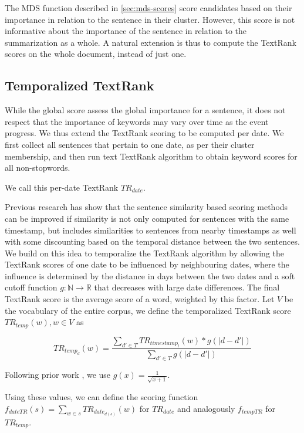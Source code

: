 \documentclass[a4paper,BCOR=10mm]{report}
\begin{document}
The MDS function described in \ref{sec:mds-scores} score candidates based on their importance in relation to the sentence in their cluster. However, this score is not informative about the importance of the sentence in relation to the summarization as a whole.
A natural extension is thus to compute the TextRank scores on the whole document, instead of just one.

\subsection{Temporalized TextRank}

While the global score assess the global importance for a sentence, it does not respect that the importance of keywords may vary over time as the event progress.
We thus extend the TextRank scoring to be computed per date. We first collect all sentences that pertain to one date, as per their cluster membership, and then run text TextRank algorithm to obtain keyword scores for all non-stopwords.

We call this per-date TextRank $TR_{date}$.

Previous research \citet{yan, markert} has show that the sentence similarity based scoring methods can be improved if similarity is not only computed for sentences with the same timestamp, but includes similarities to sentences from nearby timestamps as well with some discounting based on the temporal distance between the two sentences.
We build on this idea to temporalize the TextRank algorithm by allowing the TextRank scores of one date to be influenced by neighbouring dates, where the influence is determined by the distance in days between the two dates and a soft cutoff function $g: \mathbb{N} \rightarrow \mathbb{R}$ that decreases with large date differences.
The final TextRank score is the average score of a word, weighted by this factor.
Let $V$ be the vocabulary of the entire corpus, we define the temporalized TextRank score $TR_{temp}(w), w \in V$ as

\begin{displaymath}
    TR_{temp_d}(w) = \frac{\sum_{d' \in T} TR_{{timestamp}_t}(w) * g(|d - d'|)}{\sum_{d' \in T} g(|d - d'|)}
\end{displaymath}

Following prior work \citep{yan}, we use $g(x) = \frac{1}{\sqrt{x + 1}}$.

Using these values, we can define the scoring function $f_{dateTR}(s) = \sum_{w \in s} TR_{date_{d(s)}}(w)$ for $TR_{date}$ and analogously $f_{tempTR}$ for $TR_{temp}$.
\end{document}
